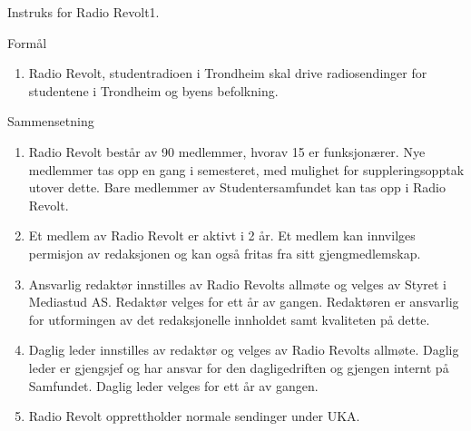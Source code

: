 
\begin{instruks}{Instruks for Radio Revolt}{1. }{ }

    \begin{instruksledd}{Formål}
        \begin{enumerate}
            \item Radio Revolt, studentradioen i Trondheim skal drive radiosendinger for studentene
                i Trondheim og byens befolkning.
        \end{enumerate}
    \end{instruksledd}

    \begin{instruksledd}{Sammensetning}
        \begin{enumerate}
            \item Radio Revolt består av 90 medlemmer, hvorav 15 er funksjonærer. Nye medlemmer tas
                opp en gang i semesteret, med mulighet for suppleringsopptak utover dette. Bare medlemmer av
                Studentersamfundet kan tas opp i Radio Revolt.
            \item Et medlem av Radio Revolt er aktivt i 2 år. Et medlem kan innvilges permisjon av
                redaksjonen og kan også fritas fra sitt gjengmedlemskap.
            \item Ansvarlig redaktør innstilles av Radio Revolts allmøte og velges av Styret i
                Mediastud AS. Redaktør velges for ett år av gangen. Redaktøren er ansvarlig for utformingen av det
                redaksjonelle innholdet samt kvaliteten på dette.
            \item Daglig leder innstilles av redaktør og velges av Radio Revolts allmøte.
                Daglig leder er gjengsjef og har ansvar for den dagligedriften og gjengen internt på Samfundet.
                Daglig leder velges for ett år av gangen.
            \item Radio Revolt opprettholder normale sendinger under UKA.
        \end{enumerate}
    \end{instruksledd}
    

\end{instruks}
